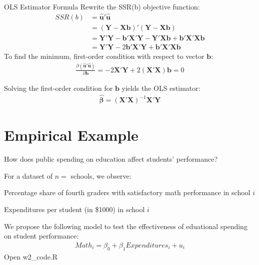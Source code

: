 \documentclass[11pt, aspectratio = 169]{beamer}
\let\svdescription\description
\let\svenddescription\enddescription
\renewenvironment{description}{%
  \svdescription%
  \let\svitem\item%
  \renewcommand\item[1][]{\svitem[\textcolor{\descriptioncolor}{##1}]}%
  }{
  \svenddescription%
  }
\newcommand\descriptioncolor{teal}
\begin{document}
\begin{frame}{OLS Estimator Formula}
Rewrite the SSR(b) objective function:
\begin{align*}
SSR(b) &= \hat{\mathbf{u}}'\hat{\mathbf{u}} \\
&=(\mathbf{Y}-\mathbf{X}\boldsymbol{b})'(\mathbf{Y}-\mathbf{X}\boldsymbol{b})\\
        &= \mathbf{Y}'\mathbf{Y}-\boldsymbol{b}'\mathbf{X}'\mathbf{Y}-\mathbf{Y}'\mathbf{X}\boldsymbol{b}+\boldsymbol{b}'\mathbf{X}'\mathbf{X}\boldsymbol{b}\\
        &=
        \mathbf{Y}'\mathbf{Y}-2\boldsymbol{b}'\mathbf{X}'\mathbf{Y}+\boldsymbol{b}'\mathbf{X}'\mathbf{X}\boldsymbol{b}
\end{align*}
\pause
To find the minimum, first-order condition with respect to vector $\boldsymbol{b}$:
\begin{align*}
\frac{\partial(\hat{\mathbf{u}}'\hat{\mathbf{u}})}{\partial\boldsymbol{b}}=-2\mathbf{X}'\mathbf{Y}+2(\mathbf{X}'\mathbf{X})\boldsymbol{b}=0
\end{align*}


Solving the first-order condition for $\mathbf{b}$ yields the OLS estimator: 
\begin{align*}
    \hat{\boldsymbol{\beta}} =
    (\mathbf{X}'\mathbf{X})^{-1}\mathbf{X}'\mathbf{Y}
\end{align*}
\end{frame}

\section{Empirical Example}

\begin{frame}{How does public spending on education affect students' performance?}

For a dataset of $n=$ schools, we observe:
\begin{description}
    \item[$Math_i$] Percentage share of fourth graders with satisfactory math performance in school $i$ 
     \item[$Expenditures_i$] Expenditures per student (in \$1000) in school $i$ 
\end{description}

\pause
\skip

We propose the following model to test the effectiveness of eduational spending on student performance:
\begin{align*}
    Math_i = \beta_0 + \beta_1 Expenditures_i + u_i
\end{align*}
\skip
Open \alert{w2\_code.R}
\end{frame}
\end{document}
